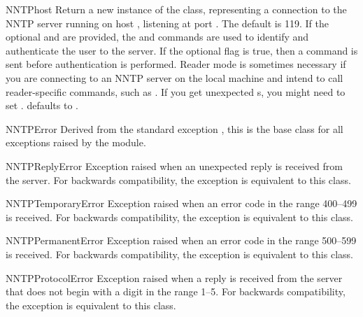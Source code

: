 \begin{classdesc}{NNTP}{host}
Return a new instance of the  class, representing a
connection to the NNTP server running on host , listening at
port .  The default  is 119.  If the optional
 and  are provided, the
 and  commands are used to
identify and authenticate the user to the server.  If the optional
flag  is true, then a  command is
sent before authentication is performed.  Reader mode is sometimes
necessary if you are connecting to an NNTP server on the local machine
and intend to call reader-specific commands, such as .  If
you get unexpected s, you might need to set
.   defaults to .
\end{classdesc}

\begin{classdesc}{NNTPError}{}
Derived from the standard exception , this is the base
class for all exceptions raised by the  module.
\end{classdesc}

\begin{classdesc}{NNTPReplyError}{}
Exception raised when an unexpected reply is received from the
server.  For backwards compatibility, the exception 
is equivalent to this class.
\end{classdesc}

\begin{classdesc}{NNTPTemporaryError}{}
Exception raised when an error code in the range 400--499 is
received.  For backwards compatibility, the exception
 is equivalent to this class.
\end{classdesc}

\begin{classdesc}{NNTPPermanentError}{}
Exception raised when an error code in the range 500--599 is
received.  For backwards compatibility, the exception
 is equivalent to this class.
\end{classdesc}

\begin{classdesc}{NNTPProtocolError}{}
Exception raised when a reply is received from the server that does
not begin with a digit in the range 1--5.  For backwards
compatibility, the exception  is equivalent to this
class.
\end{classdesc}

